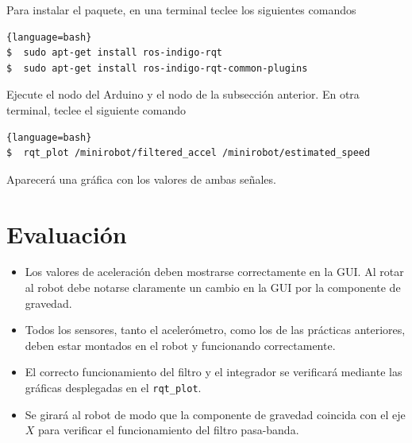 \documentclass[letterpaper,12pt]{article}
\begin{document}
Para instalar el paquete, en una terminal teclee los siguientes comandos
\begin{lstlisting}{language=bash}
$  sudo apt-get install ros-indigo-rqt
$  sudo apt-get install ros-indigo-rqt-common-plugins
\end{lstlisting}

Ejecute el nodo del Arduino y el nodo de la subsección anterior. En otra terminal, teclee el siguiente comando
\begin{lstlisting}{language=bash}
$  rqt_plot /minirobot/filtered_accel /minirobot/estimated_speed
\end{lstlisting}
Aparecerá una gráfica con los valores de ambas señales.

\section{Evaluación}
\begin{itemize}
\item Los valores de aceleración deben mostrarse correctamente en la GUI. Al rotar al robot debe notarse claramente un cambio en la GUI por la componente de gravedad.
\item Todos los sensores, tanto el acelerómetro, como los de las prácticas anteriores, deben estar montados en el robot y funcionando correctamente. 
\item El correcto funcionamiento del filtro y el integrador se verificará mediante las gráficas desplegadas en el \texttt{rqt\_plot}.
\item Se girará al robot de modo que la componente de gravedad coincida con el eje $X$ para verificar el funcionamiento del filtro pasa-banda. 
\end{itemize}
\end{document}
